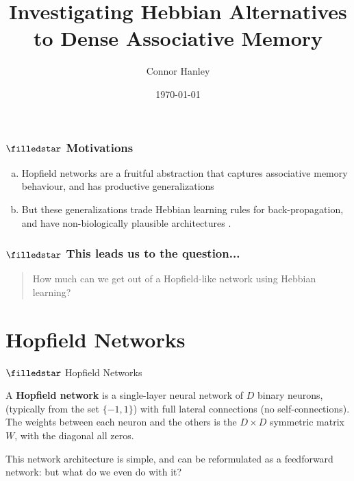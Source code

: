 \documentclass[]{beamer}
\title{Investigating Hebbian Alternatives to Dense Associative Memory}
\author{Connor Hanley}
\institute{ANIMUS Lab, Cognitive Science, Carleton University}
\date{\today}
\begin{document}
\begin{frame}
  \maketitle
\end{frame}

\begin{frame}
  \frametitle{$\filledstar$ Motivations}
  \begin{enumerate}[(a)]
    \item Hopfield networks
      \parencites{hopfield_neural_1982,hopfield_neurons_1984} are a
      fruitful abstraction that
      captures associative memory behaviour, and has productive
      generalizations
      \parencites{krotov_dense_2016,ramsauer_hopfield_2021,hoover_energy_2023}

    \item But these generalizations trade Hebbian learning rules for
      back-propagation, and have non-biologically plausible
      architectures \parencite{cox_dynamic_2024}.
  \end{enumerate}
\end{frame}

\begin{frame}
  \frametitle{$\filledstar$ This leads us to the question...}

  \begin{quote}
    How much can we get out of a Hopfield-like network using Hebbian learning?
  \end{quote}
\end{frame}

\begin{frame}
  \tableofcontents
\end{frame}

\section{Hopfield Networks}

\begin{frame}{$\filledstar$ Hopfield Networks}
  \begin{definition}\label{def:hopfield-networks}

    A \textbf{Hopfield network} \parencite{hopfield_neural_1982} is a
    single-layer neural network of $D$ binary neurons,
    (typically from the set $\{-1, 1\}$)
    with full lateral connections (no self-connections). The weights
    between each neuron
    and the others is the $D \times D$ symmetric matrix $W$, with the
    diagonal all zeros.
  \end{definition}

  This network architecture is simple, and can be reformulated as a
  feedforward network: but what do
  we even do with it?
\end{frame}
\end{document}
